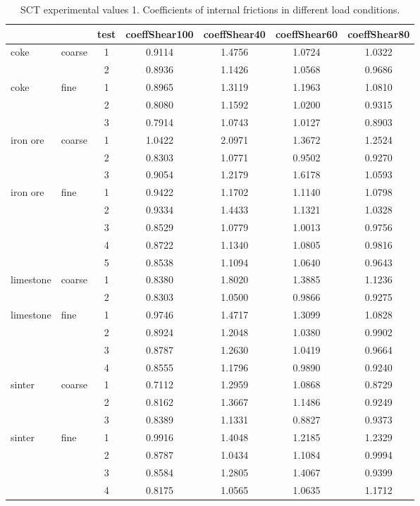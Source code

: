 \begin{table}%
\centering
\begin{tabular}{ll|c|cccc}
\hline
          &       & test  & coeffShear100 & coeffShear40 & coeffShear60 & coeffShear80 \\
\hline          
    coke  & coarse & 1     & 0.9114 & 1.4756 & 1.0724 & 1.0322 \\
          &       & 2     & 0.8936 & 1.1426 & 1.0568 & 0.9686 \\
\hline     
    coke  & fine  & 1     & 0.8965 & 1.3119 & 1.1963 & 1.0810 \\
          &       & 2     & 0.8080 & 1.1592 & 1.0200 & 0.9315 \\
          &       & 3     & 0.7914 & 1.0743 & 1.0127 & 0.8903 \\
\hline 
    iron ore & coarse & 1     & 1.0422 & 2.0971 & 1.3672 & 1.2524 \\
          &       & 2     & 0.8303 & 1.0771 & 0.9502 & 0.9270 \\
          &       & 3     & 0.9054 & 1.2179 & 1.6178 & 1.0593 \\
\hline 
    iron ore & fine  & 1     & 0.9422 & 1.1702 & 1.1140 & 1.0798 \\
          &       & 2     & 0.9334 & 1.4433 & 1.1321 & 1.0328 \\
          &       & 3     & 0.8529 & 1.0779 & 1.0013 & 0.9756 \\
          &       & 4     & 0.8722 & 1.1340 & 1.0805 & 0.9816 \\
          &       & 5     & 0.8538 & 1.1094 & 1.0640 & 0.9643 \\
\hline 
    limestone & coarse & 1     & 0.8380 & 1.8020 & 1.3885 & 1.1236 \\
          &       & 2     & 0.8303 & 1.0500 & 0.9866 & 0.9275 \\
\hline 
    limestone & fine  & 1     & 0.9746 & 1.4717 & 1.3099 & 1.0828 \\
          &       & 2     & 0.8924 & 1.2048 & 1.0380 & 0.9902 \\
          &       & 3     & 0.8787 & 1.2630 & 1.0419 & 0.9664 \\
          &       & 4     & 0.8555 & 1.1796 & 0.9890 & 0.9240 \\
\hline 
    sinter & coarse & 1     & 0.7112 & 1.2959 & 1.0868 & 0.8729 \\
          &       & 2     & 0.8162 & 1.3667 & 1.1486 & 0.9249 \\
          &       & 3     & 0.8389 & 1.1331 & 0.8827 & 0.9373 \\
\hline 
    sinter & fine  & 1     & 0.9916 & 1.4048 & 1.2185 & 1.2329 \\
          &       & 2     & 0.8787 & 1.0434 & 1.1084 & 0.9994 \\
          &       & 3     & 0.8584 & 1.2805 & 1.4067 & 0.9399 \\
          &       & 4     & 0.8175 & 1.0565 & 1.0635 & 1.1712 \\
         \hline
\end{tabular}
\caption[SCT experimental values 3]{\acs{SCT} experimental values 1.
Coefficients of internal frictions in different load conditions.}
\label{tab:22shearcell3}
\end{table}